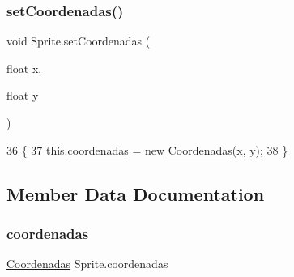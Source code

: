 \subsubsection{\texorpdfstring{set\+Coordenadas()}{setCoordenadas()}\hspace{0.1cm}{\footnotesize\ttfamily [2/2]}}
{\footnotesize\ttfamily void Sprite.\+set\+Coordenadas (\begin{DoxyParamCaption}\item[{float}]{x,  }\item[{float}]{y }\end{DoxyParamCaption})\hspace{0.3cm}{\ttfamily [inline]}}


\begin{DoxyCode}
36                                                 \{
37         this.\mbox{\hyperlink{class_sprite_ada651b6921cee54a619e11c4eb01526d}{coordenadas}} = \textcolor{keyword}{new} \mbox{\hyperlink{class_coordenadas}{Coordenadas}}(x, y);
38     \}
\end{DoxyCode}


\subsection{Member Data Documentation}
\mbox{\label{class_sprite_ada651b6921cee54a619e11c4eb01526d}} 
\subsubsection{\texorpdfstring{coordenadas}{coordenadas}}
{\footnotesize\ttfamily \mbox{\hyperlink{class_coordenadas}{Coordenadas}} Sprite.\+coordenadas\hspace{0.3cm}{\ttfamily [protected]}}


